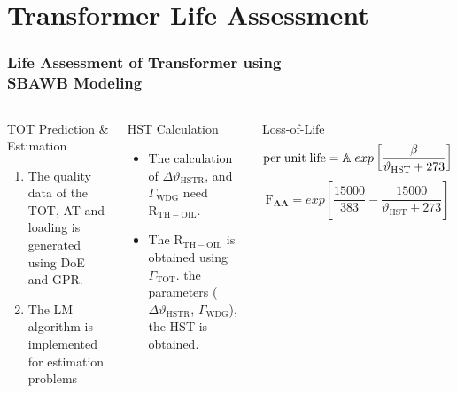 \documentclass[10pt,hyperref={pdfpagelabels=false}]{beamer}
\begin{document}
\section{Transformer Life Assessment}
\begin{frame}[fragile]
\frametitle{Life Assessment of Transformer using \\ SBAWB Modeling}
\begin{columns}
\begin{alertblock}{TOT Prediction \& Estimation}
\scriptsize
\begin{enumerate}
    \item The quality data of the TOT, AT and loading is generated using DoE and GPR.
    \item The LM algorithm is implemented for estimation problems
\end{enumerate}
\end{alertblock}
\begin{block}{HST Calculation}
\scriptsize
\begin{itemize}
    \item The calculation of $\Delta\vartheta_{\mathrm{HSTR}}$, and $\Gamma_{\mathrm{WDG}}$ need $\mathrm{R}_{\mathrm{TH-OIL}}$.
    \item The $\mathrm{R}_{\mathrm{TH-OIL}}$ is obtained using $\Gamma_{\mathrm{TOT}}$. the parameters ($\Delta\vartheta_{\mathrm{HSTR}}$,  $\Gamma_{\mathrm{WDG}}$), the HST is obtained.
\end{itemize}
\end{block}
\begin{exampleblock}{Loss-of-Life}
\scriptsize
\begin{equation*}
    \mathrm{per\hspace{0.1cm}unit\hspace{0.1cm}life} =\mathbb{A}\hspace{0.1cm}exp\left [ \frac{\beta}{\vartheta_{\mathrm{HST}}+273} \right ]
\end{equation*}
\begin{equation*}
    \mathrm{F}_{\boldsymbol{AA}}=exp\left [ \frac{15000}{383}-\frac{15000}{\vartheta_{\mathrm{HST}}+273} \right ]
\end{equation*}
\end{exampleblock}


\end{columns}
\end{frame}
\end{document}
